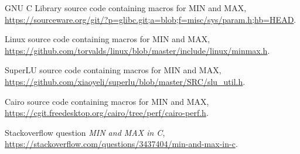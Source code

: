 \documentclass[a4paper,10pt]{scrartcl}
\begin{document}
\begin{thebibliography}{9}
GNU C Library source code containing macros for MIN and MAX, \url{https://sourceware.org/git/?p=glibc.git;a=blob;f=misc/sys/param.h;hb=HEAD}.

Linux source code containing macros for MIN and MAX, \url{https://github.com/torvalds/linux/blob/master/include/linux/minmax.h}.

SuperLU source code containing macros for MIN and MAX,\\ \url{https://github.com/xiaoyeli/superlu/blob/master/SRC/slu_util.h}.

Cairo source code containing macros for MIN and MAX,\\ \url{https://cgit.freedesktop.org/cairo/tree/perf/cairo-perf.h}.

Stackoverflow question \emph{MIN and MAX in C},\\ \url{https://stackoverflow.com/questions/3437404/min-and-max-in-c}.
\end{thebibliography}
\end{document}

